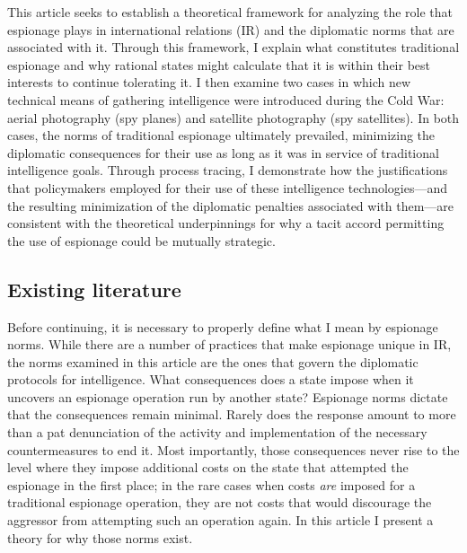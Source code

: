 \documentclass[14pt]{extarticle}
\begin{document}
This article seeks to establish a theoretical framework for analyzing the role that espionage plays in international relations (IR) and the diplomatic norms that are associated with it. Through this framework, I explain what constitutes traditional espionage and why rational states might calculate that it is within their best interests to continue tolerating it. I then examine two cases in which new technical means of gathering intelligence were introduced during the Cold War: aerial photography (spy planes) and satellite photography (spy satellites). In both cases, the norms of traditional espionage ultimately prevailed, minimizing the diplomatic consequences for their use as long as it was in service of traditional intelligence goals. Through process tracing, I demonstrate how the justifications that policymakers employed for their use of these intelligence technologies---and the resulting minimization of the diplomatic penalties associated with them---are consistent with the theoretical underpinnings for why a tacit accord permitting the use of espionage could be mutually strategic.

\subsection{Existing literature}
Before continuing, it is necessary to properly define what I mean by espionage norms. While there are a number of practices that make espionage unique in IR, the norms examined in this article are the ones that govern the diplomatic protocols for intelligence. What consequences does a state impose when it uncovers an espionage operation run by another state? Espionage norms dictate that the consequences remain minimal. Rarely does the response amount to more than a pat denunciation of the activity and implementation of the necessary countermeasures to end it. Most importantly, those consequences never rise to the level where they impose additional costs on the state that attempted the espionage in the first place; in the rare cases when costs \emph{are} imposed for a traditional espionage operation, they are not costs that would discourage the aggressor from attempting such an operation again. In this article I present a theory for why those norms exist.
\end{document}
